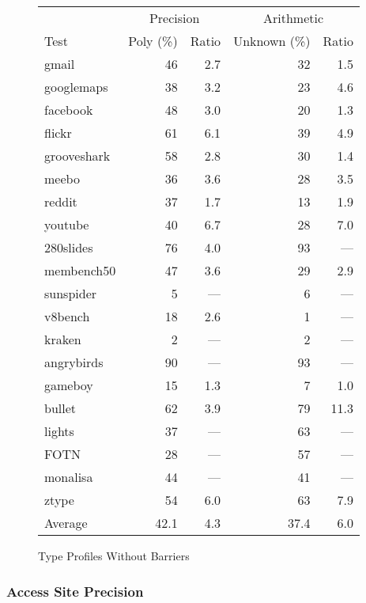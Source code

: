 \begin{figure}[ht]
\centering
\begin{tabular}{lrrrr}
\toprule
     & \multicolumn{2}{c}{Precision}
     & \multicolumn{2}{c}{Arithmetic} \\
\cmidrule(r){2-3}
\cmidrule{4-5}
Test & Poly (\%) & Ratio & Unknown (\%) & Ratio \\
\midrule
gmail          & 46 & 2.7 & 32 & 1.5 \\
googlemaps     & 38 & 3.2 & 23 & 4.6 \\
facebook       & 48 & 3.0 & 20 & 1.3 \\
flickr         & 61 & 6.1 & 39 & 4.9 \\
grooveshark    & 58 & 2.8 & 30 & 1.4 \\
meebo          & 36 & 3.6 & 28 & 3.5 \\
reddit         & 37 & 1.7 & 13 & 1.9 \\
youtube        & 40 & 6.7 & 28 & 7.0 \\
280slides      & 76 & 4.0 & 93 & --- \\
membench50     & 47 & 3.6 & 29 & 2.9 \\
\midrule
sunspider      & 5 & --- & 6 & --- \\
v8bench        & 18 & 2.6 & 1 & --- \\
kraken         & 2 & --- & 2 & --- \\
\midrule
angrybirds     & 90 & --- & 93 & --- \\
gameboy        & 15 & 1.3 & 7 & 1.0 \\
bullet         & 62 & 3.9 & 79 & 11.3 \\
lights         & 37 & --- & 63 & --- \\
FOTN           & 28 & --- & 57 & --- \\
monalisa       & 44 & --- & 41 & --- \\
ztype          & 54 & 6.0 & 63 & 7.9 \\
\midrule
Average        & 42.1 & 4.3 & 37.4 & 6.0 \\
\bottomrule
\end{tabular}
\nocaptionrule \caption{Type Profiles Without Barriers}
\label{fig:without_barriers}
\end{figure}

\subsubsection{Access Site Precision}
\label{sec:access_objects}


